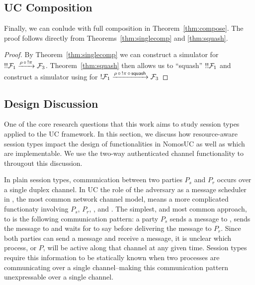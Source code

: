 \subsection{UC Composition}
Finally, we can conlude with full composition in Theorem~\ref{thm:compose}.
The proof follows directly from Theorems~\ref{thm:singlecomp} and \ref{thm:squash}.

\begin{proof}
By Theorem~\ref{thm:singlecomp} we can construct a simulator  for $!!\mathcal{F}_1 \xrightarrow{\rho \, \circ \, !\pi} \mathcal{F}_3$.
Theorem~\ref{thm:squash} then allows us to ``squash'' $!!\mathcal{F}_1$ and construct a simulator using  for $!\mathcal{F}_1 \xrightarrow{\rho \, \circ \, !\pi \, \circ \, {\mathsf {squash}}} \mathcal{F}_3$
\end{proof}

\subsection{Design Discussion}
One of the core research questions that this work aims to study session types applied to the UC framework. 
In this section, we discuss how resource-aware session types impact the design of functionalities in NomosUC as well as which are implementable.
We use the two-way authenticated channel functionality \Fauth to througout this discussion.

In plain session types, communication between two parties $P_s$ and $P_r$ occurs over a single duplex channel.
In UC the role of the adversary as a message scheduler in \Fauth, the most common network channel model, means a more complicated functionaty involving $P_s$, $P_r$, \F, and \A. 
The simplest, and most common approach, to \Fauth is the following communication pattern: a party $P_s$ sends a message to \Fauth, \Fauth sends the message to \A and waits for \A to say  before delivering the message to $P_r$.
Since both parties can send a message and receive a message, it is unclear which process, \Fauth or $P$, will be active along that channel at any given time.
Session types require this information to be statically known when two processes are communicating over a single channel--making this communication pattern unexpressable over a single channel.

